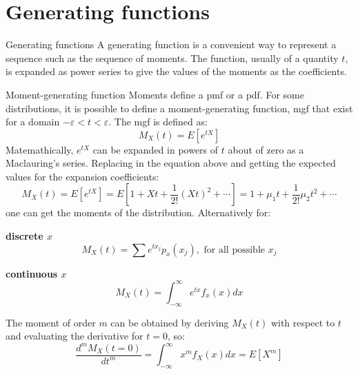 \documentclass[8pt]{beamer}
\renewcommand{\emph}[1]{\textcolor{myorange}{#1}}
\begin{document}
\section{Generating functions}
\begin{frame}{Generating functions}
    A \alert{generating function} is a convenient way to represent a sequence such as the sequence of moments. The function, usually of a quantity $t$, is expanded as \emph{power series} to give the values of the moments as the coefficients. 

    \begin{block}{Moment-generating function}
        \emph{Moments} define a \emph{pmf} or a \emph{pdf}. For some distributions, it is possible to define a \alert{moment-generating function}, \alert{mgf} that exist for a domain $-\varepsilon < t < \varepsilon$. The \emph{mgf} is defined as:
        \[
            M_X (t)  = E[e^{tX}]
        \]
        Matemathically, $e^{tX}$ can be expanded in powers of $t$ about of zero as a Maclauring's series. Replacing in the equation above and getting the expected values for the expansion coefficients:
\[
    M_X (t)  = E[e^{tX}] = E \left[ 1 + Xt + \frac{1}{2!} (Xt)^2 + \cdots \right] = 1 + \mu_1 t + \frac{1}{2!}\mu_2 t^2 + \cdots 
        \]
        one can get the moments of the distribution. Alternatively for:
\begin{minipage}[t]{0.44\textwidth}
\centering
\textbf{discrete $x$}
\[
    M_X (t) = \sum e^{t x_j} p_x (x_j), \text{ for all possible $x_j$}
\]
\end{minipage}
\begin{minipage}[t]{0.44\textwidth}
\centering
\textbf{continuous $x$}
\[
    M_X (t) = \int_{-\infty}^{\infty} e^{t x} f_x (x) dx
\]

\end{minipage}

The moment of order $m$ can be obtained by deriving $M_X (t)$ with respect to $t$ and evaluating the derivative for $t=0$, so:
\[
    \frac{d^m M_X (t=0)}{d t^m} = \int_{-\infty}^{\infty} x^m f_X (x) dx = E[X^m]
\]

    \end{block}
\end{frame}
\end{document}

